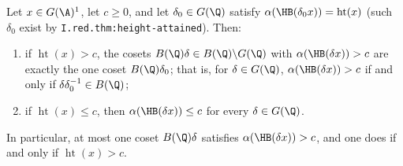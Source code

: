 Let $x\in G(\A)^1$, let $c\ge0$, and let $\delta_0\in G(\Q)$ satisfy $\alpha(\HB(\delta_0x))=\operatorname{ht}(x)$ (such $\delta_0$ exist by
\texttt{I.red.thm:height-attained}). Then:
\begin{enumerate}
  \item[(a)] if $\operatorname{ht}(x)>c$, the cosets $B(\Q)\delta\in B(\Q)\backslash G(\Q)$ with $\alpha(\HB(\delta x))>c$ are exactly the one coset
  $B(\Q)\delta_0$; that is, for $\delta\in G(\Q)$, $\alpha(\HB(\delta x))>c$ if and only if $\delta\delta_0^{-1}\in B(\Q)$;
  \item[(b)] if $\operatorname{ht}(x)\le c$, then $\alpha(\HB(\delta x))\le c$ for every $\delta\in G(\Q)$.
\end{enumerate}
In particular, at most one coset $B(\Q)\delta$ satisfies $\alpha(\HB(\delta x))>c$, and one does if and only if $\operatorname{ht}(x)>c$.
